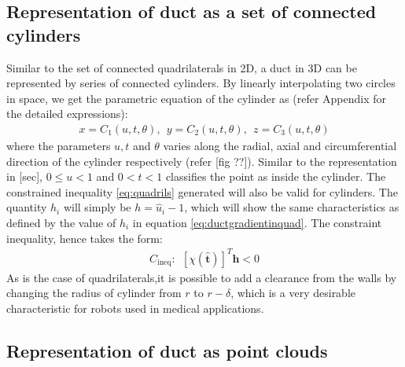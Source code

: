 \documentclass[12pt,a4]{article}
\begin{document}
\subsection{Representation of duct as a set of connected cylinders}
Similar to the set of connected quadrilaterals in 2D, a duct in 3D can be represented by series of connected cylinders. By linearly interpolating two circles in space, we get the parametric equation of the cylinder as (refer Appendix for the detailed expressions):
\begin{align}
\label{eq:cylinder}
x = C_1(u,t,\theta),~~y = C_2(u,t,\theta),~~z = C_3(u,t,\theta)
\end{align}
where the parameters $u,t$ and $\theta$ varies along the radial, axial and circumferential direction of the cylinder respectively (refer [fig ??]). Similar to the representation in [sec], $0\leq u< 1$ and $0<t<1$ classifies the point as inside the cylinder. The constrained inequality \ref{eq:quadrils} generated will also be valid for cylinders. The quantity $h_i$ will simply be $h = \hat{u}_i-1$, which will show the same characteristics as defined by the value of $h_i$ in equation \ref{eq:ductgradientinquad}. The constraint inequality, hence takes the form:
\begin{align}
\label{eq:const_cyl}
C_\text{ineq}:~~\left[\chi\left(\hat{\mathbf{t}}\right)\right]^T\mathbf{h}<0
\end{align}
As is the case of quadrilaterals,it is possible to add a clearance from the walls by changing the radius of cylinder from $r$ to $r-\delta$, which is a very desirable characteristic for robots used in medical applications. 





\subsection{Representation of duct as point clouds}\label{sc:duct_as_STL}
\end{document}
